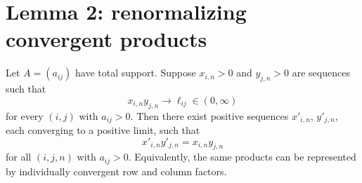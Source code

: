 \section{Lemma 2: renormalizing convergent products}
\begin{lemma}
Let \(A=(a_{ij})\) have total support.  Suppose \(x_{i,n}>0\) and \(y_{j,n}>0\) are sequences such that
\[
  x_{i,n}y_{j,n}\to \ell_{ij}\in(0,\infty)
\]
for every \((i,j)\) with \(a_{ij}>0\).  Then there exist positive sequences \(x'_{i,n}\), \(y'_{j,n}\), each converging to a positive limit, such that
\[
  x'_{i,n}y'_{j,n}=x_{i,n}y_{j,n}
\]
for all \((i,j,n)\) with \(a_{ij}>0\).  Equivalently, the same products can be represented by individually convergent row and column factors.
\end{lemma}

